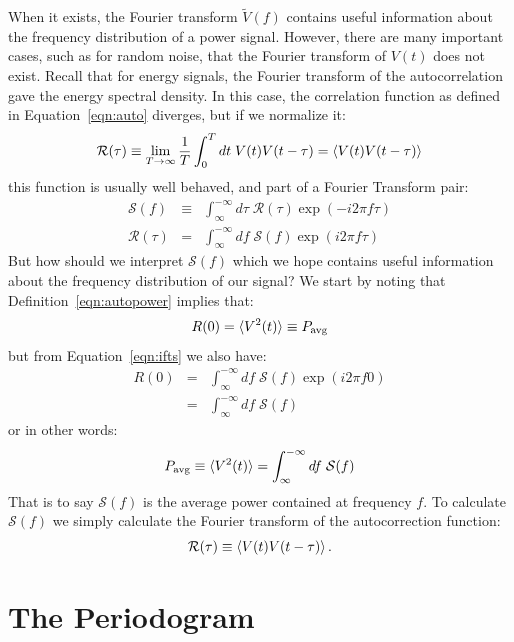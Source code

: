 \documentclass[12pt]{article}
\begin{document}
When it exists, the Fourier transform $\widetilde{V}(f)$ contains useful information about the frequency distribution of a power signal.  However, there are many important cases, such as for random noise, that the Fourier transform of $V(t)$ does not exist.  Recall that for energy signals, the Fourier transform of the autocorrelation gave the energy spectral density.  In this case, the correlation function as defined in Equation~\ref{eqn:auto} diverges, but if we normalize it:
\begin{equation}
\mathcal{R}(\tau) \equiv \lim_{T \to \infty } \frac{1}{T} \int_{0}^{T} dt \; V(t) V(t-\tau) = \braket{V(t) V(t-\tau)}
\label{eqn:autopower}
\end{equation}
this function is usually well behaved, and part of a Fourier Transform pair:
\begin{eqnarray}
\mathcal{S}(f) &\equiv& \int_{\infty}^{-\infty} d\tau \; \mathcal{R}(\tau) \exp(-i2\pi f \tau) \\ 
\mathcal{R}(\tau) &=& \int_{\infty}^{-\infty} df \; \mathcal{S}(f) \exp(i2\pi f \tau)  \label{eqn:ifts}
\end{eqnarray}
But how should we interpret $\mathcal{S}(f)$ which we hope contains useful information about the frequency distribution of our signal?  We start by noting that Definition~\ref{eqn:autopower} implies
that:
\begin{displaymath}
R(0) = \braket{V^2(t)} \equiv P_{\rm avg}
\end{displaymath}
but from Equation~\ref{eqn:ifts} we also have:
\begin{eqnarray*}
R(0) &=& \int_{\infty}^{-\infty} df \; \mathcal{S}(f) \exp(i2\pi f 0) \\
        &=& \int_{\infty}^{-\infty} df \; \mathcal{S}(f)
\end{eqnarray*}
or in other words:
\begin{displaymath}
P_{\rm avg} \equiv \braket{V^2(t)} = \int_{\infty}^{-\infty} df \; \mathcal{S}(f) 
\end{displaymath}
That is to say $\mathcal{S}(f)$ is the average power contained at frequency $f$.  To calculate $\mathcal{S}(f)$ we simply calculate the Fourier transform of the autocorrection function:
\begin{equation}
\mathcal{R}(\tau) \equiv \braket{V(t) V(t-\tau)}.
\end{equation}

\section{The Periodogram}
\end{document}
